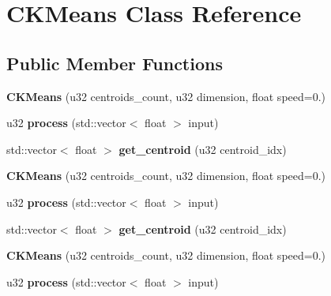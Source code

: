 \hypertarget{classCKMeans}{\section{C\-K\-Means Class Reference}
\label{classCKMeans}
}
\subsection*{Public Member Functions}
\begin{DoxyCompactItemize}
\item 
\hypertarget{classCKMeans_a8901727f51a1cbb649a01e7a05b5a296}{{\bfseries C\-K\-Means} (u32 centroids\-\_\-count, u32 dimension, float speed=0.)}\label{classCKMeans_a8901727f51a1cbb649a01e7a05b5a296}

\item 
\hypertarget{classCKMeans_a0f1386295c73bd9643caeb5afd712d40}{u32 {\bfseries process} (std\-::vector$<$ float $>$ input)}\label{classCKMeans_a0f1386295c73bd9643caeb5afd712d40}

\item 
\hypertarget{classCKMeans_ab3ea451af9c60749dd73d57436f1e458}{std\-::vector$<$ float $>$ {\bfseries get\-\_\-centroid} (u32 centroid\-\_\-idx)}\label{classCKMeans_ab3ea451af9c60749dd73d57436f1e458}

\item 
\hypertarget{classCKMeans_a8901727f51a1cbb649a01e7a05b5a296}{{\bfseries C\-K\-Means} (u32 centroids\-\_\-count, u32 dimension, float speed=0.)}\label{classCKMeans_a8901727f51a1cbb649a01e7a05b5a296}

\item 
\hypertarget{classCKMeans_a0f1386295c73bd9643caeb5afd712d40}{u32 {\bfseries process} (std\-::vector$<$ float $>$ input)}\label{classCKMeans_a0f1386295c73bd9643caeb5afd712d40}

\item 
\hypertarget{classCKMeans_aad8e04e240531802800a962c87b9463b}{std\-::vector$<$ float $>$ {\bfseries get\-\_\-centroid} (u32 centroid\-\_\-idx)}\label{classCKMeans_aad8e04e240531802800a962c87b9463b}

\item 
\hypertarget{classCKMeans_a8901727f51a1cbb649a01e7a05b5a296}{{\bfseries C\-K\-Means} (u32 centroids\-\_\-count, u32 dimension, float speed=0.)}\label{classCKMeans_a8901727f51a1cbb649a01e7a05b5a296}

\item 
\hypertarget{classCKMeans_a0f1386295c73bd9643caeb5afd712d40}{u32 {\bfseries process} (std\-::vector$<$ float $>$ input)}\label{classCKMeans_a0f1386295c73bd9643caeb5afd712d40}


\end{DoxyCompactItemize}
